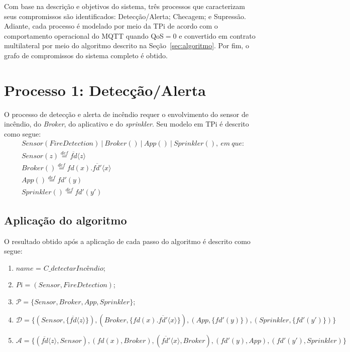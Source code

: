 Com base na descrição e objetivos do sistema, três processos que caracterizam seus compromissos são identificados: Detecção/Alerta; Checagem; e Supressão. Adiante, cada processo é modelado por meio da TPi de acordo com o comportamento operacional do MQTT quando QoS$=0$ e convertido em contrato multilateral por meio do algoritmo descrito na Seção~\ref{sec:algoritmo}. Por fim, o grafo de compromissos do sistema completo é obtido.

\section{Processo 1: Detecção/Alerta}

O processo de detecção e alerta de incêndio requer o envolvimento do sensor de incêndio, do \textit{Broker}, do aplicativo e do \textit{sprinkler}. Seu modelo em TPi é descrito como segue:
\begin{align}
& Sensor(FireDetection)~|~Broker()~|~App()~|~Sprinkler(),~em~que: \nonumber \\
& Sensor(z) \stackrel{def}{=} \overline{fd}\langle z \rangle \nonumber \\
& Broker() \stackrel{def}{=} fd(x).\overline{fd'}\langle x \rangle \nonumber \\
& App() \stackrel{def}{=} fd'(y) \nonumber \\
& Sprinkler() \stackrel{def}{=} fd'(y')
\end{align}

\subsection*{Aplicação do algoritmo}

O resultado obtido após a aplicação de cada passo do algoritmo é descrito como segue:
\begin{enumerate}
	\item $name$ = $C\_detectarIncêndio$;
	\item $Pi = (Sensor, FireDetection)$;
	\item $\mathcal{P} = \{Sensor, Broker, App, Sprinkler\}$;
	\item $\mathcal{D} = \{(Sensor, \{\overline{fd}\langle z \rangle\}), (Broker, \{fd(x).\overline{fd'}\langle x \rangle\}), (App, \{fd'(y)\}), (Sprinkler, \{fd'(y')\})\}$
	\item $\mathcal{A} = \{(\overline{fd}\langle z \rangle, Sensor), (fd(x), Broker), (\overline{fd'}\langle x \rangle, Broker), (fd'(y), App), (fd'(y'), Sprinkler)\}$
\end{enumerate}

